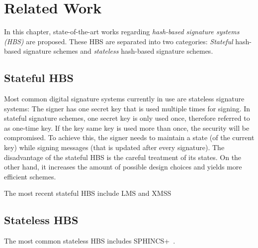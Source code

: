 \chapter{Related Work}
\label{cha:stateOfTheArt}

In this chapter, state-of-the-art works regarding \textit{hash-based signature systems (HBS)} are proposed. 
These HBS are separated into two categories: \textit{Stateful} hash-based signature schemes and \textit{stateless} hash-based signature schemes.  

\section{Stateful HBS}
Most common digital signature systems currently in use are stateless signature systems: The signer has one secret key that is used multiple times for signing. In stateful signature schemes, one secret key is only used once, therefore referred to as one-time key. If the key same key is used more than once, the security will be compromised. 
To achieve this, the signer needs to maintain a state (of the current key) while signing messages (that is updated after every signature).
The disadvantage of the stateful HBS is the careful treatment of its states. On the other hand, it increases the amount of possible design choices and yields more efficient schemes.~\cite{properties_stateless_HBS_2022}

The most recent stateful HBS include LMS and XMSS~\cite{stateful_hashbased_sign_schemes_NIST_2020}


\section{Stateless HBS}
The most common stateless HBS includes SPHINCS+~\cite{tweakable_basispaper_sphincs_2019}. 




